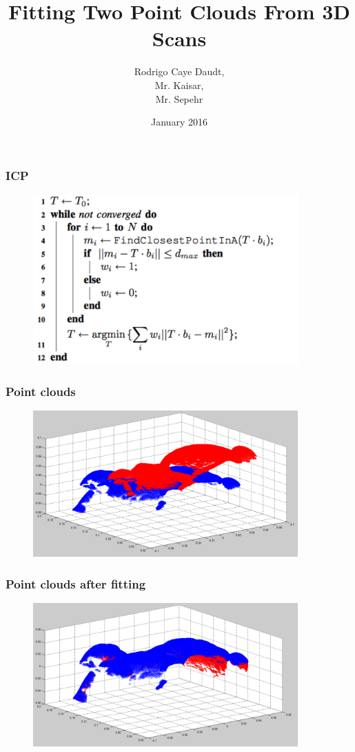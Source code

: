\documentclass{beamer}
\title{Fitting Two Point Clouds From 3D Scans}
\author{Rodrigo Caye Daudt,\\ Mr. Kaisar,\\ Mr. Sepehr}
\institute{Université de Bourgogne}
\date{January 2016}
\begin{document}
\frame{\titlepage}

\begin{frame}
\frametitle{ICP}

\begin{figure}[H]
\centering
\includegraphics[width=4in]{figures/04-ICP.png}
\end{figure}

\end{frame}


\begin{frame}
\frametitle{Point clouds}

\begin{figure}[H]
\centering
\includegraphics[width=4in]{figures/01-bunnies.png}
\end{figure}

\end{frame}


\begin{frame}
\frametitle{Point clouds after fitting}

\begin{figure}[H]
\centering
\includegraphics[width=4in]{figures/02-fittedBunnies.png}
\end{figure}

\end{frame}
\end{document}
